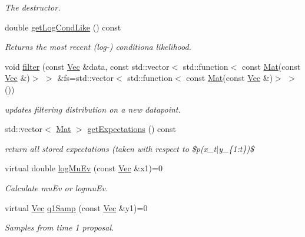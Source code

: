 \begin{DoxyCompactItemize}
\begin{DoxyCompactList}\small\item\em The destructor. \end{DoxyCompactList}\item 
double \hyperlink{classBSFilter_a8db158adf8136ade250d243a289154a8}{get\+Log\+Cond\+Like} () const 
\begin{DoxyCompactList}\small\item\em Returns the most recent (log-\/) conditiona likelihood. \end{DoxyCompactList}\item 
void \hyperlink{classBSFilter_a38dbc8460036319a676926e5f0240249}{filter} (const \hyperlink{apf__filter_8h_a4c7df05c6f5e8a0d15ae14bcdbc07152}{Vec} \&data, const std\+::vector$<$ std\+::function$<$ const \hyperlink{apf__filter_8h_ae601f56a556993079f730483c574356f}{Mat}(const \hyperlink{apf__filter_8h_a4c7df05c6f5e8a0d15ae14bcdbc07152}{Vec} \&)$>$ $>$ \&fs=std\+::vector$<$ std\+::function$<$ const \hyperlink{apf__filter_8h_ae601f56a556993079f730483c574356f}{Mat}(const \hyperlink{apf__filter_8h_a4c7df05c6f5e8a0d15ae14bcdbc07152}{Vec} \&)$>$ $>$())
\begin{DoxyCompactList}\small\item\em updates filtering distribution on a new datapoint. \end{DoxyCompactList}\item 
std\+::vector$<$ \hyperlink{apf__filter_8h_ae601f56a556993079f730483c574356f}{Mat} $>$ \hyperlink{classBSFilter_aad9844b6cf839b99db2b29556a225f75}{get\+Expectations} () const 
\begin{DoxyCompactList}\small\item\em return all stored expectations (taken with respect to \$p(x\+\_\+t$\vert$y\+\_\+\{1\+:t\})\$ \end{DoxyCompactList}\item 
virtual double \hyperlink{classBSFilter_a9317b6253d10ee5b50f68515ae7a5cb7}{log\+Mu\+Ev} (const \hyperlink{apf__filter_8h_a4c7df05c6f5e8a0d15ae14bcdbc07152}{Vec} \&x1)=0
\begin{DoxyCompactList}\small\item\em Calculate mu\+Ev or logmu\+Ev. \end{DoxyCompactList}\item 
virtual \hyperlink{apf__filter_8h_a4c7df05c6f5e8a0d15ae14bcdbc07152}{Vec} \hyperlink{classBSFilter_a981b7de2820c496508f7fe23723add06}{q1\+Samp} (const \hyperlink{apf__filter_8h_a4c7df05c6f5e8a0d15ae14bcdbc07152}{Vec} \&y1)=0
\begin{DoxyCompactList}\small\item\em Samples from time 1 proposal. \end{DoxyCompactList}\item 

\end{DoxyCompactItemize}
